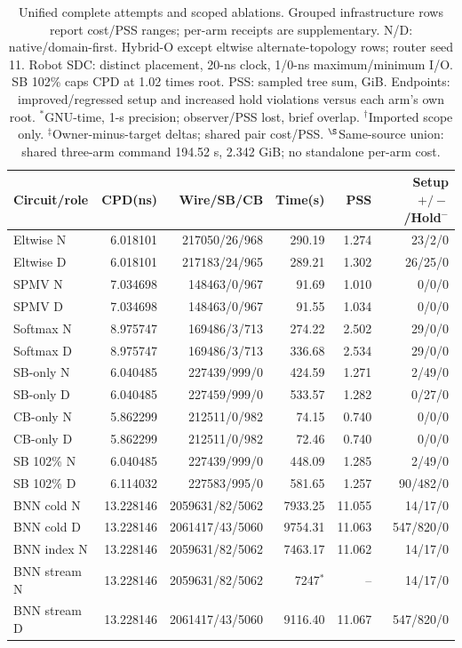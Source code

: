 \documentclass[conference,10pt]{IEEEtran}
\begin{document}
\begin{table}[t]
\centering\footnotesize\setlength{\tabcolsep}{3 pt}
\caption{Unified complete attempts and scoped ablations. Grouped infrastructure rows report cost/PSS ranges; per-arm receipts are supplementary. N/D: native/domain-first. Hybrid-O except eltwise alternate-topology rows; router seed 11. Robot SDC: distinct placement, 20-ns clock, 1/0-ns maximum/minimum I/O. SB 102\% caps CPD at 1.02 times root. PSS: sampled tree sum, GiB. Endpoints: improved/regressed setup and increased hold violations versus each arm's own root. $^{*}$GNU-time, 1-s precision; observer/PSS lost, brief overlap. $^{\dagger}$Imported scope only. $^{\ddagger}$Owner-minus-target deltas; shared pair cost/PSS. $^{\S}$Same-source union: shared three-arm command 194.52 s, 2.342 GiB; no standalone per-arm cost.}
\label{tab:completecost}
\begin{tabular}{lrrrrr}\hline
Circuit/role & CPD(ns) & Wire/SB/CB & Time(s) & PSS & Setup $+/-$/Hold$^-$\\\hline
Eltwise N&6.018101&217050/26/968&290.19&1.274&23/2/0\\
Eltwise D&6.018101&217183/24/965&289.21&1.302&26/25/0\\
SPMV N&7.034698&148463/0/967&91.69&1.010&0/0/0\\
SPMV D&7.034698&148463/0/967&91.55&1.034&0/0/0\\
Softmax N&8.975747&169486/3/713&274.22&2.502&29/0/0\\
Softmax D&8.975747&169486/3/713&336.68&2.534&29/0/0\\
SB-only N&6.040485&227439/999/0&424.59&1.271&2/49/0\\
SB-only D&6.040485&227459/999/0&533.57&1.282&0/27/0\\
CB-only N&5.862299&212511/0/982&74.15&0.740&0/0/0\\
CB-only D&5.862299&212511/0/982&72.46&0.740&0/0/0\\
SB 102\% N&6.040485&227439/999/0&448.09&1.285&2/49/0\\
SB 102\% D&6.114032&227583/995/0&581.65&1.257&90/482/0\\
BNN cold N&13.228146&2059631/82/5062&7933.25&11.055&14/17/0\\
BNN cold D&13.228146&2061417/43/5060&9754.31&11.063&547/820/0\\
BNN index N&13.228146&2059631/82/5062&7463.17&11.062&14/17/0\\
BNN stream N&13.228146&2059631/82/5062&7247$^{*}$&--&14/17/0\\
BNN stream D&13.228146&2061417/43/5060&9116.40&11.067&547/820/0\\

\end{tabular}
\end{table}
\end{document}
